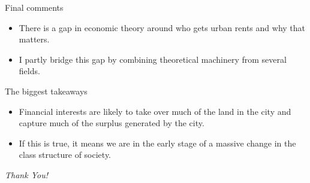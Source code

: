 \documentclass[]{beamer} %
\begin{document}
\begin{frame}{Final comments}
 \begin{itemize}[<+->] \Large
\item There is a gap in economic theory around who gets urban rents and why that matters.\vspace{.5cm}
\item I partly bridge this gap by combining theoretical machinery from several fields.

\end{itemize}
\end{frame}
\begin{frame}{The biggest takeaways} 
\Large
\begin{itemize}[<+->]
    \item Financial interests are likely to take over much of the land in the city and capture much of the surplus generated by the city.\vspace{.5cm}
    \item If this is true, it means we are in the early stage of a massive change in the class structure of society.
\end{itemize}
\end{frame}
\begin{frame}
  \centering \Huge

  \emph{Thank You!}
\end{frame}
\end{document}
